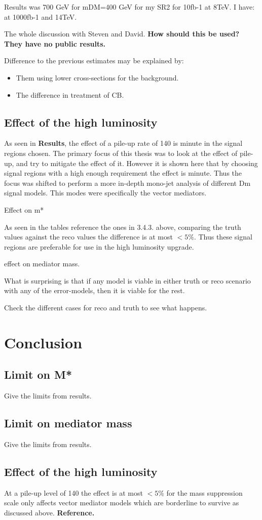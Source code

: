 Results was 700 GeV for mDM=400 GeV for my SR2 for 10fb-1 at 8TeV.
I have: at 1000fb-1 and 14TeV.

The whole discussion with Steven and David. \textbf{How should this be used? They have no public results.}

Difference to the previous estimates may be explained by: 
\begin{itemize}
\item Them using lower cross-sections for the background.
\item The difference in treatment of CB.
\end{itemize}

\subsection{Effect of the high luminosity}\label{subsec:hleff}
As seen in \textbf{Results}, the effect of a pile-up rate of 140 is minute in the signal regions chosen. The primary focus of this thesis was to look at the effect of pile-up, and try to mitigate the effect of it. However it is shown here that by choosing signal regions with a high enough requirement the effect is minute. Thus the focus was shifted to perform a more in-depth mono-jet analysis of different Dm signal models. This modes were specifically the vector mediators.

Effect on m*

As seen in the tables reference the ones in 3.4.3. above, comparing the truth values against the reco values the difference is at most $<5 \% $. Thus these signal regions are preferable for use in the high luminosity upgrade.  

effect on mediator mass.

What is surprising is that if any model is viable in either truth or reco scenario with any of the error-models, then it is viable for the rest. 

Check the different cases for reco and truth to see what happens.



\newpage
\section{Conclusion}
\subsection{Limit on M*}
Give the limits from results.


\subsection{Limit on mediator mass}
Give the limits from results.

\subsection{Effect of the high luminosity}
At a pile-up level of 140 the effect is at most $<5\%$ for the mass suppression scale only affects vector mediator models which are borderline to survive as discussed above. \textbf{Reference.} 